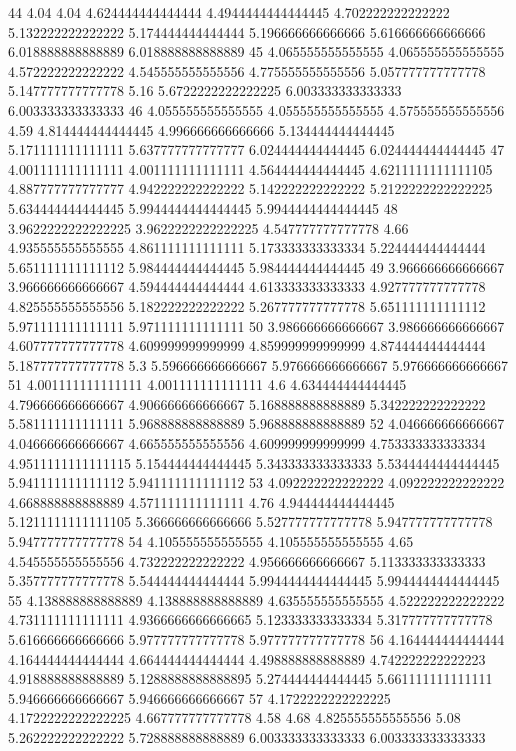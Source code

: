 44 4.04 4.04 4.624444444444444 4.4944444444444445 4.702222222222222 5.132222222222222 5.174444444444444 5.196666666666666 5.616666666666666 6.018888888888889 6.018888888888889
45 4.065555555555555 4.065555555555555 4.572222222222222 4.545555555555556 4.775555555555556 5.057777777777778 5.147777777777778 5.16 5.6722222222222225 6.003333333333333 6.003333333333333
46 4.055555555555555 4.055555555555555 4.575555555555556 4.59 4.814444444444445 4.996666666666666 5.134444444444445 5.171111111111111 5.637777777777777 6.024444444444445 6.024444444444445
47 4.001111111111111 4.001111111111111 4.564444444444445 4.6211111111111105 4.887777777777777 4.942222222222222 5.142222222222222 5.2122222222222225 5.634444444444445 5.9944444444444445 5.9944444444444445
48 3.9622222222222225 3.9622222222222225 4.547777777777778 4.66 4.935555555555555 4.861111111111111 5.173333333333334 5.224444444444444 5.651111111111112 5.984444444444445 5.984444444444445
49 3.966666666666667 3.966666666666667 4.594444444444444 4.613333333333333 4.927777777777778 4.825555555555556 5.182222222222222 5.267777777777778 5.651111111111112 5.971111111111111 5.971111111111111
50 3.986666666666667 3.986666666666667 4.607777777777778 4.609999999999999 4.859999999999999 4.874444444444444 5.187777777777778 5.3 5.596666666666667 5.976666666666667 5.976666666666667
51 4.001111111111111 4.001111111111111 4.6 4.634444444444445 4.796666666666667 4.906666666666667 5.168888888888889 5.342222222222222 5.581111111111111 5.968888888888889 5.968888888888889
52 4.046666666666667 4.046666666666667 4.665555555555556 4.609999999999999 4.753333333333334 4.9511111111111115 5.154444444444445 5.343333333333333 5.5344444444444445 5.941111111111112 5.941111111111112
53 4.092222222222222 4.092222222222222 4.668888888888889 4.571111111111111 4.76 4.944444444444445 5.1211111111111105 5.366666666666666 5.527777777777778 5.947777777777778 5.947777777777778
54 4.105555555555555 4.105555555555555 4.65 4.545555555555556 4.732222222222222 4.956666666666667 5.113333333333333 5.357777777777778 5.544444444444444 5.9944444444444445 5.9944444444444445
55 4.138888888888889 4.138888888888889 4.635555555555555 4.522222222222222 4.731111111111111 4.9366666666666665 5.123333333333334 5.317777777777778 5.616666666666666 5.977777777777778 5.977777777777778
56 4.164444444444444 4.164444444444444 4.664444444444444 4.498888888888889 4.742222222222223 4.918888888888889 5.1288888888888895 5.274444444444445 5.661111111111111 5.946666666666667 5.946666666666667
57 4.1722222222222225 4.1722222222222225 4.667777777777778 4.58 4.68 4.825555555555556 5.08 5.262222222222222 5.728888888888889 6.003333333333333 6.003333333333333
